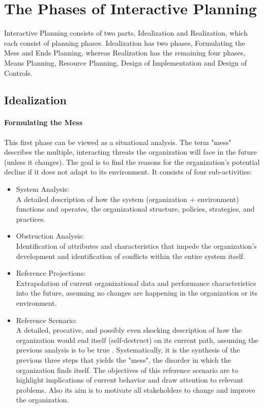 \documentclass[
a4paper,
12pt
]{scrartcl}
\begin{document}
     
     \section{The Phases of Interactive Planning}
	
	Interactive Planning consists of two parts, Idealization and Realization, which each consist of planning phases. Idealization has two phases, Formulating the Mess and Ends Planning, whereas Realization has the remaining four phases, Means Planning, Resource Planning, Design of Implementation and Design of Controls.
	
	\subsection{Idealization}
	\paragraph{Formulating the Mess} 
	
	This first phase can be viewed as a situational analysis. The term "mess" describes the multiple, interacting threats the organization will face in the future (unless it changes). The goal is to find the reasons for the organization's potential decline if it does not adapt to its environment. It consists of four sub-activities: 
	
	\begin{itemize}
		\item System Analysis:\\
		A detailed description of how the system (organization + environment) functions and operates,  the organizational structure, policies, strategies, and practices.
		
			\item Obstruction Analysis:\\
			Identification of attributes and characteristics that impede the organization's development and identification of conflicts within the entire system itself.
			
			\item Reference Projections:\\
			Extrapolation of current organizational data and performance characteristics into the future, assuming no changes are happening in the organization or its environment.
			
			\item Reference Scenario:\\
			A detailed, procative, and possibly even shocking description of how the organization would end itself (self-destruct) on its current path, assuming the previous analysis is to be true \cite{lumbo:2007}. Systematically, it is the synthesis of the previous three steps that yields the "mess", the disorder in which the organization finds itself. 
			The objectives of this reference scenario are to highlight implications of current behavior and draw attention to relevant problems. Also its aim is to motivate all stakeholders to change and improve the organization.
	\end{itemize}
	
\end{document}
